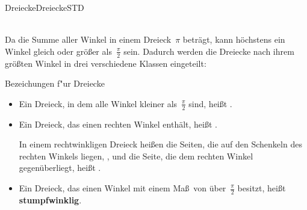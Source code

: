 \begin{MXContent}{Dreiecke}{Dreiecke}{STD}


\ \\
Da die Summe aller Winkel in einem Dreieck~$\pi$ betr\"agt, kann h\"ochstens
ein Winkel gleich oder gr\"o\ss er als~$\frac{\pi}{2}$ sein. Dadurch werden die
Dreiecke nach ihrem gr\"o\ss ten Winkel in drei verschiedene Klassen eingeteilt:
\begin{MXInfo}{Bezeichungen f"ur Dreiecke}%
\begin{itemize}
 \item Ein Dreieck, in dem alle Winkel kleiner als~$\frac{\pi}{2}$ sind, hei\ss t .
 
 \item Ein Dreieck, das einen rechten Winkel enth\"alt, hei\ss t .
 
       In einem rechtwinkligen Dreieck hei\ss en die Seiten, die auf den Schenkeln des
       rechten Winkels liegen, ,
       und die Seite, die dem rechten Winkel gegen\"uberliegt, hei\ss t
       .
       
 \item Ein Dreieck, das einen Winkel mit einem Ma\ss\ von \"uber~$\frac{\pi}{2}$
       besitzt, hei\ss t \textbf{stumpfwinklig}.
\end{itemize}
\end{MXInfo}


\end{MXContent}
